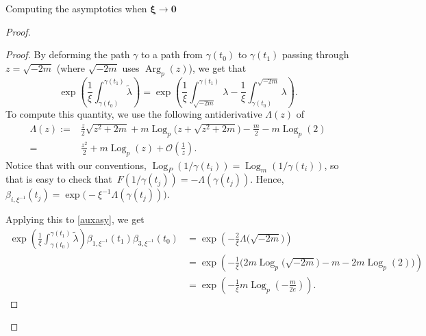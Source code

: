 \begin{subsubsection}{Computing the asymptotics when $\boldsymbol{\xi \to 0}$}
\begin{proof}
\begin{proof}
By deforming the path $\gamma$ to a path from $\gamma(t_0)$ to $\gamma(t_1)$ passing through $z=\sqrt{-2m}$ (where $\sqrt{-2m}$ uses $\operatorname{Arg}_p(z)$), we get that
\begin{equation}\label{auxasy}
 \exp \left(\frac{1}{\xi}\int_{\gamma(t_0)}^{\gamma(t_1)}\widetilde{\lambda}\right)=\exp \left(\frac{1}{\xi}\int_{\sqrt{-2m}}^{\gamma(t_1)}\lambda -\frac{1}{\xi}\int_{\gamma(t_0)}^{\sqrt{-2m}}\lambda\right).
\end{equation}
To compute this quantity, we use the following antiderivative $\Lambda(z)$ of 
\begin{align*}
 \Lambda(z):=&{}\frac{z}{2}\sqrt{z^2+2m} + m\operatorname{Log}_p\bigl(z+\sqrt{z^2+2m}\bigr) -\frac{m}{2}-m\operatorname{Log}_p(2)\\
={}&\frac{z^2}{2}+m\operatorname{Log}_p(z)+\mathcal{O}\left(\frac{1}{z}\right).
\end{align*}
 Notice that with our conventions, $\operatorname{Log}_P(1/\gamma(t_i))=\operatorname{Log}_m(1/\gamma(t_i))$, so that is easy to check that~${F(1/\gamma(t_j))=-\Lambda(\gamma(t_j))}$. Hence, $\beta_{i,\xi^{-1}}(t_j)=\exp \bigl(-\xi^{-1}\Lambda(\gamma(t_j))\bigr)$.

Applying this to \eqref{auxasy}, we get
\begin{align*}
 \exp \left(\frac{1}{\xi}\int_{\gamma(t_0)}^{\gamma(t_1)}\widetilde{\lambda}\right)\beta_{1,\xi^{-1}}(t_1)\beta_{3,\xi^{-1}}(t_0)&=\exp \left(-\frac{2}{\xi}\Lambda\bigl(\sqrt{-2m}\bigr)\right)\\
 &=\exp \left(-\frac{1}{\xi}\bigl(2m\operatorname{Log}_p\bigl(\sqrt{-2m}\bigr) -m -2m\operatorname{Log}_p(2)\bigr)\right)\\
 &=\exp \left(-\frac{1}{\xi}m\operatorname{Log}_p\left(-\frac{m}{2e}\right)\right).\tag*{\qed}
\end{align*}\renewcommand{\qed}{}
\end{proof}


\end{proof}
\end{subsubsection}
